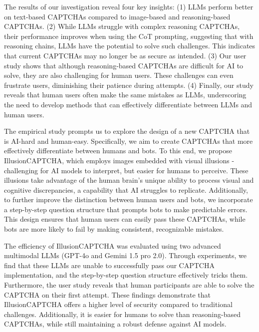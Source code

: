 The results of our investigation reveal four key insights: (1) LLMs perform better on text-based CAPTCHAs compared to image-based and reasoning-based CAPTCHAs. (2) While LLMs struggle with complex reasoning CAPTCHAs, their performance improves when using the CoT prompting, suggesting that with reasoning chains, LLMs have the potential to solve such challenges. This indicates that current CAPTCHAs may no longer be as secure as intended. (3) Our user study shows that although reasoning-based CAPTCHAs are difficult for AI to solve, they are also challenging for human users. These challenges can even frustrate users, diminishing their patience during attempts. (4) Finally, our study reveals that human users often make the same mistakes as LLMs, underscoring the need to develop methods that can effectively differentiate between LLMs and human users.

The empirical study prompts us to explore the design of a new CAPTCHA that is AI-hard and human-easy. Specifically, we aim to create CAPTCHAs that more effectively differentiate between humans and bots. To this end, we propose IllusionCAPTCHA, which employs images embedded with visual illusions - challenging for AI models to interpret, but easier for humans to perceive. These illusions take advantage of the human brain's unique ability to process visual and cognitive discrepancies, a capability that AI struggles to replicate. Additionally, to further improve the distinction between human users and bots, we incorporate a step-by-step question structure that prompts bots to make predictable errors. This design ensures that human users can easily pass these CAPTCHAs, while bots are more likely to fail by making consistent, recognizable mistakes.

The efficiency of IllusionCAPTCHA was evaluated using two advanced multimodal LLMs (GPT-4o and Gemini 1.5 pro 2.0). Through experiments, we find that these LLMs are unable to successfully pass our CAPTCHA implementation, and the step-by-step question structure effectively tricks them. Furthermore, the user study reveals that human participants are able to solve the CAPTCHA on their first attempt. These findings demonstrate that IllusionCAPTCHA offers a higher level of security compared to traditional challenges. Additionally, it is easier for humans to solve than reasoning-based CAPTCHAs, while still maintaining a robust defense against AI models.

